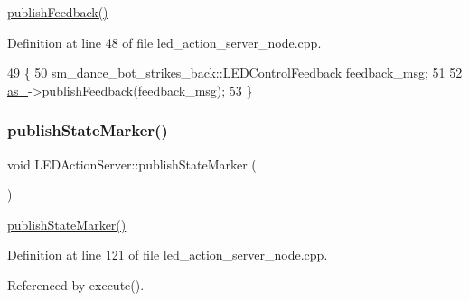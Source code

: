 \hyperlink{classLEDActionServer_a25c93d4e7ecdacbb4f5b090d7789aa36}{publish\+Feedback()} 

Definition at line 48 of file led\+\_\+action\+\_\+server\+\_\+node.\+cpp.


\begin{DoxyCode}
49 \{
50     sm\_dance\_bot\_strikes\_back::LEDControlFeedback feedback\_msg;
51     
52     \hyperlink{classLEDActionServer_a61d21c77642081acf017d4ebd65b2de0}{as\_}->publishFeedback(feedback\_msg);
53 \}
\end{DoxyCode}
\mbox{\label{classLEDActionServer_a73bb754ac2347c50660624ad92315895}} 
\subsubsection{\texorpdfstring{publish\+State\+Marker()}{publishStateMarker()}\hspace{0.1cm}{\footnotesize\ttfamily [1/2]}}
{\footnotesize\ttfamily void L\+E\+D\+Action\+Server\+::publish\+State\+Marker (\begin{DoxyParamCaption}{ }\end{DoxyParamCaption})\hspace{0.3cm}{\ttfamily [inline]}}

\hyperlink{classLEDActionServer_a73bb754ac2347c50660624ad92315895}{publish\+State\+Marker()} 

Definition at line 121 of file led\+\_\+action\+\_\+server\+\_\+node.\+cpp.



Referenced by execute().


